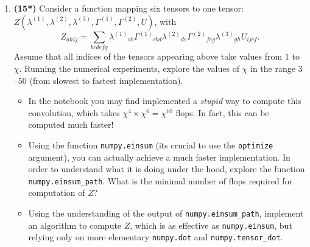 \documentclass[prb,papersize=a4paper,notitlepage]{revtex4-2}%
\begin{document}
\begin{enumerate}
\item \textbf{(15*)} Consider a function mapping six tensors to one tensor: $Z\left(\lambda^{(1)},\lambda^{(2)},\lambda^{(3)},\Gamma^{(1)}, \Gamma^{(2)}, U\right)$, with
\begin{equation}
Z_{ahij} = \sum_{bcdefg}\lambda^{(1)}{}_{ab}\Gamma^{(1)}{}_{cbd}\lambda^{(2)}{}_{de}\Gamma^{(2)}{}_{feg}\lambda^{(3)}{}_{gh}U_{ijcf}\label{eq:TEBD}.
\end{equation}
Assume that all indices of the tensors appearing above take values from $1$ to $\chi$. Running the numerical experiments, explore the values of $\chi$ in the range $3$--$50$ (from slowest to fastest implementation).
\begin{itemize}
    \item In the notebook  you may find implemented a \emph{stupid} way to compute this convolution, which takes $\chi^4\times \chi^{6} = \chi^{10}$ flops. In fact, this can be computed much faster!
    \item Using the function \texttt{numpy.einsum} (its crucial to use the \texttt{optimize} argument), you can actually achieve a much faster implementation. In order to understand what it is doing under the hood, explore the function \texttt{numpy.einsum\_path}. What is the minimal number of flops required for computation of $Z$?
    \item Using the understanding of the output of \texttt{numpy.einsum\_path}, implement an algorithm to compute $Z$, which is as effective as \texttt{numpy.einsum}, but relying only on more elementary \texttt{numpy.dot} and \texttt{numpy.tensor\_dot}.
\end{itemize}


\end{enumerate}
\end{document}
